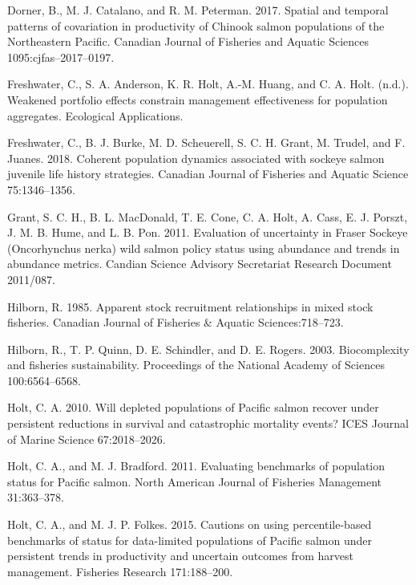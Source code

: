 \documentclass[11pt]{book}
\begin{document}
{{{\hypertarget{ref-Dorner2017}{}
Dorner, B., M. J. Catalano, and R. M. Peterman. 2017. Spatial and temporal patterns of covariation in productivity of Chinook salmon populations of the Northeastern Pacific. Canadian Journal of Fisheries and Aquatic Sciences 1095:cjfas--2017--0197.

\hypertarget{ref-FreshwaterSub}{}
Freshwater, C., S. A. Anderson, K. R. Holt, A.-M. Huang, and C. A. Holt. (n.d.). Weakened portfolio effects constrain management effectiveness for population aggregates. Ecological Applications.

\hypertarget{ref-Freshwater2018}{}
Freshwater, C., B. J. Burke, M. D. Scheuerell, S. C. H. Grant, M. Trudel, and F. Juanes. 2018. Coherent population dynamics associated with sockeye salmon juvenile life history strategies. Canadian Journal of Fisheries and Aquatic Science 75:1346--1356.

\hypertarget{ref-Grant2011}{}
Grant, S. C. H., B. L. MacDonald, T. E. Cone, C. A. Holt, A. Cass, E. J. Porszt, J. M. B. Hume, and L. B. Pon. 2011. Evaluation of uncertainty in Fraser Sockeye (Oncorhynchus nerka) wild salmon policy status using abundance and trends in abundance metrics. Candian Science Advisory Secretariat Research Document 2011/087.

\hypertarget{ref-Hilborn1985}{}
Hilborn, R. 1985. Apparent stock recruitment relationships in mixed stock fisheries. Canadian Journal of Fisheries \& Aquatic Sciences:718--723.

\hypertarget{ref-Hilborn2003}{}
Hilborn, R., T. P. Quinn, D. E. Schindler, and D. E. Rogers. 2003. Biocomplexity and fisheries sustainability. Proceedings of the National Academy of Sciences 100:6564--6568.

\hypertarget{ref-Holt2010}{}
Holt, C. A. 2010. Will depleted populations of Pacific salmon recover under persistent reductions in survival and catastrophic mortality events? ICES Journal of Marine Science 67:2018--2026.

\hypertarget{ref-Holt2011}{}
Holt, C. A., and M. J. Bradford. 2011. Evaluating benchmarks of population status for Pacific salmon. North American Journal of Fisheries Management 31:363--378.

\hypertarget{ref-Holt2015}{}
Holt, C. A., and M. J. P. Folkes. 2015. Cautions on using percentile-based benchmarks of status for data-limited populations of Pacific salmon under persistent trends in productivity and uncertain outcomes from harvest management. Fisheries Research 171:188--200.

}}}
\end{document}
